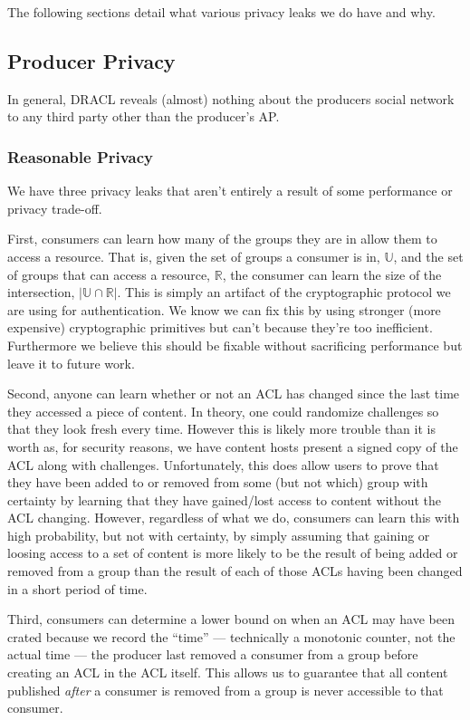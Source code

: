 \documentclass[pdftex,12pt,a4papaer,twoside,notitlepage]{report}
\begin{document}
The following sections detail what various privacy leaks we do have and why.

\subsection{Producer Privacy}
\label{sub:producer_privacy}

In general, DRACL reveals (almost) nothing about the producers social network to
any third party other than the producer's AP.

\subsubsection{Reasonable Privacy}
\label{sub:resonable_privacy}

We have three privacy leaks that aren't entirely a result of some performance or
privacy trade-off.

First, consumers can learn how many of the groups they are in allow them to
access a resource. That is, given the set of groups a consumer is in,
$\mathbb{U}$, and the set of groups that can access a resource, $\mathbb{R}$,
the consumer can learn the size of the intersection, $|\mathbb{U} \cap
\mathbb{R}|$. This is simply an artifact of the cryptographic protocol we are
using for authentication. We know we can fix this by using stronger (more
expensive) cryptographic primitives but can't because they're too inefficient.
Furthermore we believe this should be fixable without sacrificing performance
but leave it to future work.

Second, anyone can learn whether or not an ACL has changed since the last time
they accessed a piece of content. In theory, one could randomize challenges so
that they look fresh every time. However this is likely more trouble than it is
worth as, for security reasons, we have content hosts present a signed copy of
the ACL along with challenges. Unfortunately, this does allow users to prove
that they have been added to or removed from some (but not which) group with
certainty by learning that they have gained/lost access to content without the
ACL changing. However, regardless of what we do, consumers can learn this with
high probability, but not with certainty, by simply assuming that gaining or
loosing access to a set of content is more likely to be the result of being
added or removed from a group than the result of each of those ACLs having been
changed in a short period of time.

Third, consumers can determine a lower bound on when an ACL may have been crated
because we record the ``time'' --- technically a monotonic counter, not the
actual time --- the producer last removed a consumer from a group before creating
an ACL in the ACL itself. This allows us to guarantee that all content published
\emph{after} a consumer is removed from a group is never accessible to that
consumer.
\end{document}
